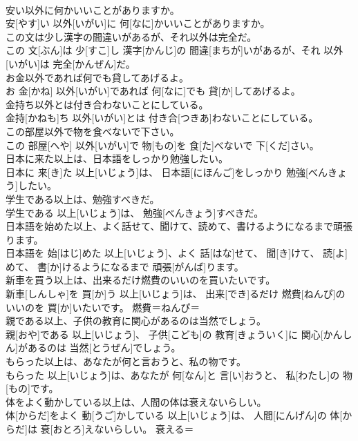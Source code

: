 \documentclass[8pt]{extreport}
\begin{document}
\begin{CJK}{UTF8}{min}
\\	安い以外に何かいいことがありますか。	
\\	安[やす]い 以外[いがい]に 何[なに]かいいことがありますか。	
\\	この文は少し漢字の間違いがあるが、それ以外は完全だ。	
\\	この 文[ぶん]は 少[すこ]し 漢字[かんじ]の 間違[まちが]いがあるが、それ 以外[いがい]は 完全[かんぜん]だ。	
\\	お金以外であれば何でも貸してあげるよ。	
\\	お 金[かね] 以外[いがい]であれば 何[なに]でも 貸[か]してあげるよ。	
\\	金持ち以外とは付き合わないことにしている。	
\\	金持[かねも]ち 以外[いがい]とは 付き合[つきあ]わないことにしている。	
\\	この部屋以外で物を食べないで下さい。	
\\	この 部屋[へや] 以外[いがい]で 物[もの]を 食[た]べないで 下[くだ]さい。	
\\	日本に来た以上は、日本語をしっかり勉強したい。	
\\	日本に 来[き]た 以上[いじょう]は、 日本語[にほんご]をしっかり 勉強[べんきょう]したい。	
\\	学生である以上は、勉強すべきだ。	
\\	学生である 以上[いじょう]は、 勉強[べんきょう]すべきだ。	
\\	日本語を始めた以上、よく話せて、聞けて、読めて、書けるようになるまで頑張ります。	
\\	日本語を 始[はじ]めた 以上[いじょう]、よく 話[はな]せて、 聞[き]けて、 読[よ]めて、 書[か]けるようになるまで 頑張[がんば]ります。	
\\	新車を買う以上は、出来るだけ燃費のいいのを買いたいです。	
\\	新車[しんしゃ]を 買[か]う 以上[いじょう]は、 出来[でき]るだけ 燃費[ねんぴ]のいいのを 買[か]いたいです。	燃費＝ねんぴ＝ 
\\	親である以上、子供の教育に関心があるのは当然でしょう。	
\\	親[おや]である 以上[いじょう]、 子供[こども]の 教育[きょういく]に 関心[かんしん]があるのは 当然[とうぜん]でしょう。	
\\	もらった以上は、あなたが何と言おうと、私の物です。	
\\	もらった 以上[いじょう]は、あなたが 何[なん]と 言[い]おうと、 私[わたし]の 物[もの]です。	
\\	体をよく動かしている以上は、人間の体は衰えないらしい。	
\\	体[からだ]をよく 動[うご]かしている 以上[いじょう]は、 人間[にんげん]の 体[からだ]は 衰[おとろ]えないらしい。	衰える＝ 

\end{CJK}
\end{document}
